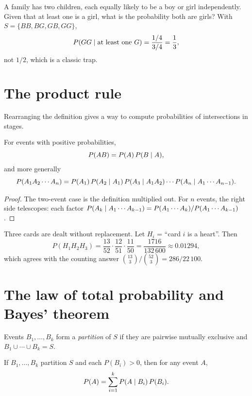 \begin{example}[Children]
A family has two children, each equally likely to be a boy or girl independently. Given
that at least one is a girl, what is the probability both are girls? With
$S = \{BB,BG,GB,GG\}$,
\[
  P(GG \mid \text{at least one } G) = \frac{1/4}{3/4} = \frac13,
\]
not $1/2$, which is a classic trap.
\end{example}

\section{The product rule}

Rearranging the definition gives a way to compute probabilities of intersections in
stages.

\begin{theorem}
For events with positive probabilities,
\[
  P(AB) = P(A)\,P(B\mid A),
\]
and more generally
\[
  P(A_1A_2\cdots A_n) = P(A_1)\,P(A_2\mid A_1)\,P(A_3\mid A_1A_2)\cdots
  P(A_n\mid A_1\cdots A_{n-1}).
\]
\end{theorem}

\begin{proof}
The two-event case is the definition multiplied out. For $n$ events, the right side
telescopes: each factor $P(A_k\mid A_1\cdots A_{k-1}) = P(A_1\cdots A_k)/P(A_1\cdots A_{k-1})$.
\end{proof}

\begin{example}
Three cards are dealt without replacement. Let $H_i$ = ``card $i$ is a heart''. Then
\[
  P(H_1H_2H_3) = \frac{13}{52}\cdot\frac{12}{51}\cdot\frac{11}{50} = \frac{1716}{132\,600}
  \approx 0.01294,
\]
which agrees with the counting answer $\binom{13}3/\binom{52}3 = 286/22\,100$.
\end{example}

\section{The law of total probability and Bayes' theorem}

\begin{definition}[Partition]
Events $B_1, \dots, B_k$ form a \emph{partition} of $S$ if they are pairwise mutually
exclusive and $B_1\cup\cdots\cup B_k = S$.
\end{definition}

\begin{theorem}
If $B_1,\dots,B_k$ partition $S$ and each $P(B_i)>0$, then for any event $A$,
\[
  P(A) = \sum_{i=1}^k P(A\mid B_i)\,P(B_i).
\]
\end{theorem}

